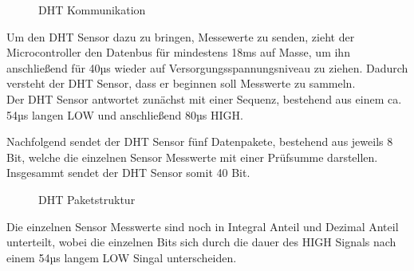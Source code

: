 \begin{center}
	\begin{figure}[h]
	 
	 \noindent{}
	 \caption[DHT Kommunikation]{DHT Kommunikation}
	 \label{fig:dhtkommunikation}
	\end{figure}
\end{center}


Um den DHT Sensor dazu zu bringen, Messewerte zu senden, zieht der Microcontroller den Datenbus für mindestens 18ms auf Masse, um ihn anschließend für 40µs wieder auf Versorgungsspannungsniveau zu ziehen. Dadurch versteht der DHT Sensor, dass er beginnen soll Messwerte zu sammeln.\\
Der DHT Sensor antwortet zunächst mit einer Sequenz, bestehend aus einem ca. 54µs langen LOW und anschließend 80µs HIGH. 

\newpage

Nachfolgend sendet der DHT Sensor fünf Datenpakete, bestehend aus jeweils 8 Bit, welche die einzelnen Sensor Messwerte mit einer Prüfsumme darstellen. Insgesammt sendet der DHT Sensor somit 40 Bit.

\begin{center}
	\begin{figure}[h]
	 
	 \noindent{}
	 \caption[DHT Paketstruktur]{DHT Paketstruktur}
	 \label{fig:dhtpaketstruktur}
	\end{figure}
\end{center}

Die einzelnen Sensor Messwerte sind noch in Integral Anteil und Dezimal Anteil unterteilt, wobei die einzelnen Bits sich durch die dauer des HIGH Signals nach einem 54µs langem LOW Singal unterscheiden.

